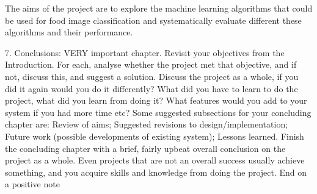 The aims of the project are to explore the machine learning algorithms that could be used for food image classification and systematically evaluate different these algorithms and their performance.

7.	Conclusions: VERY important chapter. Revisit your objectives from the Introduction.  For each, analyse whether the project met that objective, and if not, discuss this, and suggest a solution. Discuss the project as a whole, if you did it again would you do it differently? What did you have to learn to do the project, what did you learn from doing it? What features would you add to your system if you had more time etc? Some suggested subsections for your concluding chapter are: Review of aims; Suggested revisions to design/implementation; Future work (possible developments of existing system); Lessons learned. Finish the concluding chapter with a brief, fairly upbeat overall conclusion on the project as a whole. Even projects that are not an overall success usually achieve something, and you acquire skills and knowledge from doing the project. End on a positive note
